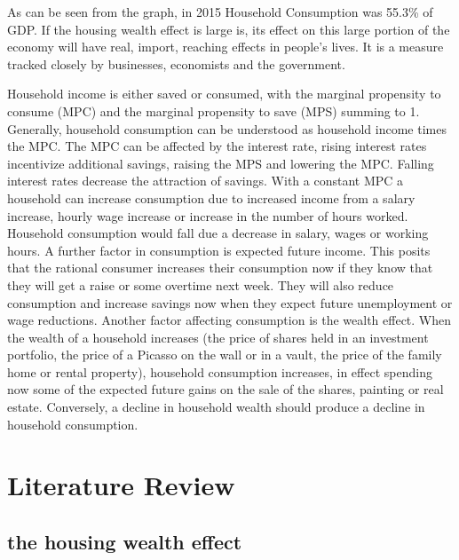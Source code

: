 \documentclass[12pt,a4paper,]{article}
\begin{document}
As can be seen from the graph, in 2015 Household Consumption was 55.3\%
of GDP. If the housing wealth effect is large is, its effect on this
large portion of the economy will have real, import, reaching effects in
people's lives. It is a measure tracked closely by businesses,
economists and the government.

Household income is either saved or consumed, with the marginal
propensity to consume (MPC) and the marginal propensity to save (MPS)
summing to 1. Generally, household consumption can be understood as
household income times the MPC. The MPC can be affected by the interest
rate, rising interest rates incentivize additional savings, raising the
MPS and lowering the MPC. Falling interest rates decrease the attraction
of savings. With a constant MPC a household can increase consumption due
to increased income from a salary increase, hourly wage increase or
increase in the number of hours worked. Household consumption would fall
due a decrease in salary, wages or working hours. A further factor in
consumption is expected future income. This posits that the rational
consumer increases their consumption now if they know that they will get
a raise or some overtime next week. They will also reduce consumption
and increase savings now when they expect future unemployment or wage
reductions. Another factor affecting consumption is the wealth effect.
When the wealth of a household increases (the price of shares held in an
investment portfolio, the price of a Picasso on the wall or in a vault,
the price of the family home or rental property), household consumption
increases, in effect spending now some of the expected future gains on
the sale of the shares, painting or real estate. Conversely, a decline
in household wealth should produce a decline in household consumption.

\section{Literature Review}\label{literature-review}

\subsection{the housing wealth effect}\label{the-housing-wealth-effect}
\end{document}

